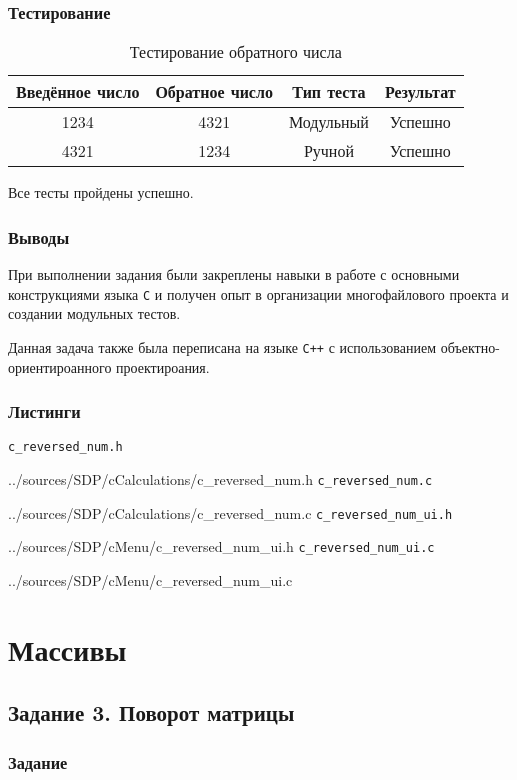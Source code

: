 \documentclass[12pt,a4paper]{report}
\begin{document}
\subsection{Тестирование}
\begin{table}[h]
\caption{Тестирование обратного числа}
\label{sum_of_digits_test}
\begin{tabular}{|c|c|c|c|}
\hline 
Введённое число & Обратное число & Тип теста & Результат \\ 
\hline 
1234 & 4321 & Модульный & Успешно \\ 
\hline 
4321 & 1234 & Ручной & Успешно \\ 
\hline 
\end{tabular} 
\end{table}

Все тесты пройдены успешно.
\subsection{Выводы}
\hspace{\parindent}При выполнении задания были закреплены навыки в работе с основными конструкциями языка \texttt{C} и получен опыт в организации многофайлового проекта и создании модульных тестов.

Данная задача также была переписана на языке \verb|C++| с использованием объектно-ориентироанного проектироания.
\newpage
\subsection{Листинги}
\verb+c_reversed_num.h+

{../sources/SDP/cCalculations/c_reversed_num.h}
\verb+c_reversed_num.c+

{../sources/SDP/cCalculations/c_reversed_num.c}
\verb+c_reversed_num_ui.h+

{../sources/SDP/cMenu/c_reversed_num_ui.h}
\verb+c_reversed_num_ui.c+

{../sources/SDP/cMenu/c_reversed_num_ui.c}


\newpage
\chapter{Массивы}
\section{Задание 3. Поворот матрицы}
\subsection{Задание}
\end{document}
